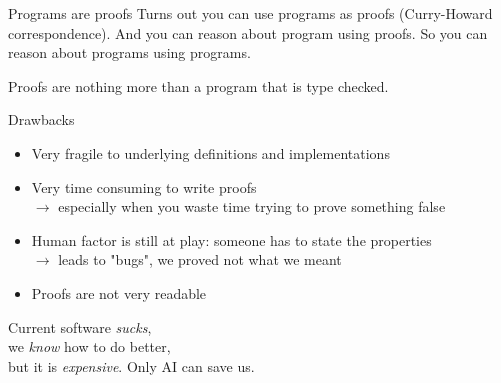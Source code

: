 \documentclass[compress,12pt,xcolor={dvipsnames}]{beamer}
\begin{document}
\begin{frame}{Programs are proofs}
    Turns out you can use programs as proofs (Curry-Howard correspondence). And you can reason about program using proofs. So you can reason about programs using programs.

    Proofs are nothing more than a program that is type checked. 
\end{frame}

\begin{frame}
\end{frame}

\begin{frame}{Drawbacks}
    \begin{itemize}
        \item Very fragile to underlying definitions and implementations
        \item Very time consuming to write proofs \\
              $\to$ especially when you waste time trying to prove something false
        \item Human factor is still at play: someone has to state the properties \\
              $\to$ leads to "bugs", we proved not what we meant
        \item Proofs are not very readable
    \end{itemize}
\end{frame}


\End
\begin{frame}
    \centering
    Current software \textit{sucks}, \\we \textit{know} how to do better, \\but it is \textit{expensive}.
    \vfill
    Only AI can save us.
\end{frame}

\end{document}
